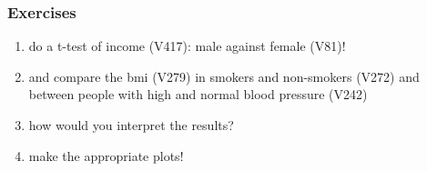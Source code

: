 \documentclass[xcolor={table}]{beamer}
\begin{document}
\begin{frame}\frametitle{Exercises} 
  \begin{enumerate}
  \item do a t-test of income (V417): male against female (V81)!
  \item and compare the bmi (V279) in smokers and non-smokers (V272) and between people with high and normal blood pressure (V242)
  \item how would you interpret the results?
  \item make the appropriate plots!
  \end{enumerate}
\end{frame}
\end{document}
